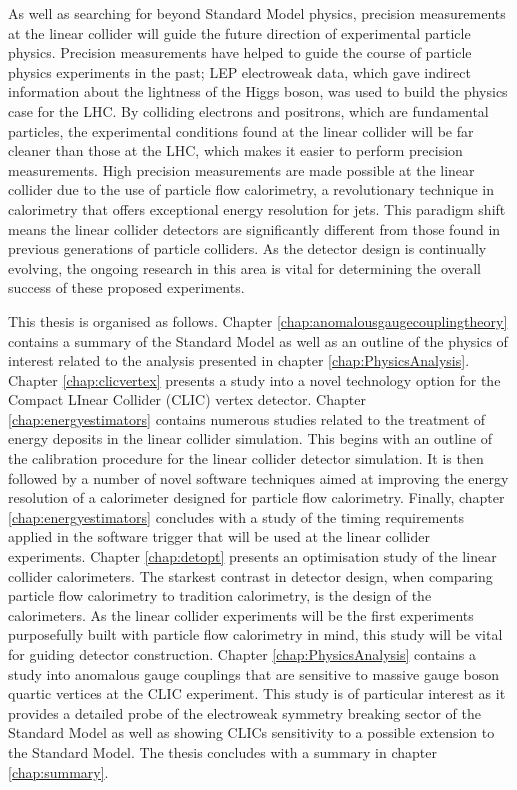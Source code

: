 As well as searching for beyond Standard Model physics, precision measurements at the linear collider will guide the future direction of experimental particle physics.  Precision measurements have helped to guide the course of particle physics experiments in the past; LEP electroweak data, which gave indirect information about the lightness of the Higgs boson, was used to build the physics case for the LHC.  By colliding electrons and positrons, which are fundamental particles, the experimental conditions found at the linear collider will be far cleaner than those at the LHC, which makes it easier to perform precision measurements.  High precision measurements are made possible at the linear collider due to the use of particle flow calorimetry, a revolutionary technique in calorimetry that offers exceptional energy resolution for jets.  This paradigm shift means the linear collider detectors are significantly different from those found in previous generations of particle colliders.  As the detector design is continually evolving, the ongoing research in this area is vital for determining the overall success of these proposed experiments.  

This thesis is organised as follows.  Chapter \ref{chap:anomalousgaugecouplingtheory} contains a summary of the Standard Model as well as an outline of the physics of interest related to the analysis presented in chapter \ref{chap:PhysicsAnalysis}.  Chapter \ref{chap:clicvertex} presents a study into a novel technology option for the Compact LInear Collider (CLIC) vertex detector.  Chapter \ref{chap:energyestimators} contains numerous studies related to the treatment of energy deposits in the linear collider simulation.  This begins with an outline of the calibration procedure for the linear collider detector simulation.  It is then followed by a number of novel software techniques aimed at improving the energy resolution of a calorimeter designed for particle flow calorimetry.  Finally, chapter \ref{chap:energyestimators} concludes with a study of the timing requirements applied in the software trigger that will be used at the linear collider experiments.  Chapter \ref{chap:detopt} presents an optimisation study of the linear collider calorimeters.  The starkest contrast in detector design, when comparing particle flow calorimetry to tradition calorimetry, is the design of the calorimeters.  As the linear collider experiments will be the first experiments purposefully built with particle flow calorimetry in mind, this study will be vital for guiding detector construction.  Chapter \ref{chap:PhysicsAnalysis} contains a study into anomalous gauge couplings that are sensitive to massive gauge boson quartic vertices at the CLIC experiment.  This study is of particular interest as it provides a detailed probe of the electroweak symmetry breaking sector of the Standard Model as well as showing CLICs sensitivity to a possible extension to the Standard Model.  The thesis concludes with a summary in chapter \ref{chap:summary}.

